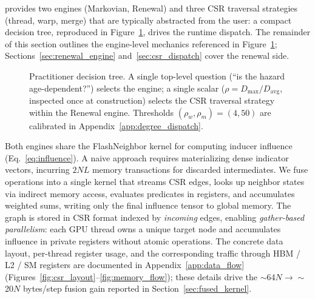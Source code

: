 \flashspread{} provides two engines (Markovian, Renewal) and three CSR traversal strategies (thread, warp, merge) that are typically abstracted from the user: a compact decision tree, reproduced in Figure~\ref{fig:decision_tree}, drives the runtime dispatch. The remainder of this section outlines the engine-level mechanics referenced in Figure~\ref{fig:decision_tree}; Sections~\ref{sec:renewal_engine} and~\ref{sec:csr_dispatch} cover the renewal side.
\begin{figure}[H]
\centering

\caption{Practitioner decision tree. A single top-level question (``is the hazard age-dependent?'') selects the engine; a single scalar ($\rho = D_{\max}/D_{\mathrm{avg}}$, inspected once at construction) selects the CSR traversal strategy within the Renewal engine. Thresholds $(\rho_w, \rho_m) = (4, 50)$ are calibrated in Appendix~\ref{app:degree_dispatch}.}
\label{fig:decision_tree}
\end{figure}
Both engines share the FlashNeighbor kernel\label{sec:flash_neighbor} for computing inducer influence (Eq.~\ref{eq:influence}). A naive approach requires materializing dense indicator vectors, incurring $2NL$ memory transactions for discarded intermediates. We fuse operations into a single kernel that streams CSR edges, looks up neighbor states via indirect memory access, evaluates predicates in registers, and accumulates weighted sums, writing only the final influence tensor to global memory. The graph is stored in CSR format indexed by \emph{incoming} edges, enabling \emph{gather-based parallelism}: each GPU thread owns a unique target node and accumulates influence in private registers without atomic operations. The concrete data layout, per-thread register usage, and the corresponding traffic through HBM / L2 / SM registers are documented in Appendix~\ref{app:data_flow} (Figures~\ref{fig:csr_layout}--\ref{fig:memory_flow}); these details drive the $\sim$64$N \to \sim$20$N$ bytes/step fusion gain reported in Section~\ref{sec:fused_kernel}.

